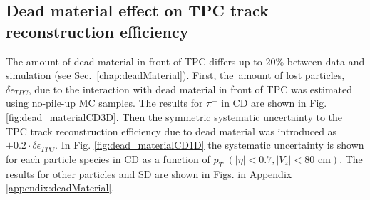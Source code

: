 \subsection{Dead material effect on TPC track reconstruction efficiency}\label{sec:deadMaterialSystematics}
The amount of dead material in front of TPC differs up to $20\%$ between data and simulation (see Sec.~\ref{chap:deadMaterial}). First, the~amount of lost particles, $\delta\epsilon_{ TPC}$, due to the interaction with dead material in front of TPC was estimated using  no-pile-up  MC samples. The results for $\pi^-$ in CD are shown in Fig. \ref{fig:dead_materialCD3D}. Then the symmetric systematic uncertainty to the TPC track reconstruction efficiency due to dead material was introduced as $\pm 0.2 \cdot\delta\epsilon_{ TPC}$.
In Fig. \ref{fig:dead_materialCD1D}  the systematic uncertainty is shown for each particle species in CD as a function of $p_T$ $\left(|\eta|<0.7, |V_{z}|<80 \text{ cm}\right)$. 
The results for other particles and SD are shown in Figs. in Appendix \ref{appendix:deadMaterial}.
